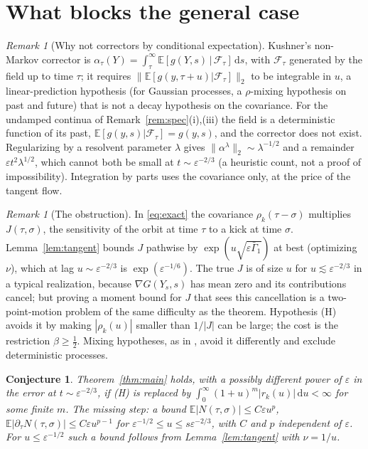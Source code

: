 \documentclass[11pt]{article}
\newcommand{\dd}{\mathrm{d}}
\newcommand{\E}{\mathbb{E}}
\newcommand{\eps}{\varepsilon}
\newcommand{\nrm}[2]{\|#1\|_{#2}}
\newtheorem{conjecture}[theorem]{Conjecture}
\theoremstyle{remark}
\newtheorem{remark}[theorem]{Remark}
\begin{document}
\section{What blocks the general case}
\label{sec:open}

\begin{remark}[Why not correctors by conditional expectation]\label{rem:kushner}
Kushner's non-Markov corrector is
$\alpha_\tau(Y) = \int_\tau^\infty\E[g(Y,s)\,|\,\mathcal{F}_\tau]\,\dd s$, with
$\mathcal{F}_\tau$ generated by the field up to time $\tau$; it requires
$\nrm{\E[g(y,\tau+u)|\mathcal{F}_\tau]}{2}$ to be integrable in $u$, a
linear-prediction hypothesis (for Gaussian processes, a $\rho$-mixing
hypothesis on past and future) that is not a decay hypothesis on the
covariance. For the undamped continua
of Remark~\ref{rem:spec}(i),(iii) the field is a deterministic function of
its past, $\E[g(y,s)|\mathcal{F}_\tau] = g(y,s)$, and the corrector does not
exist. Regularizing by a resolvent parameter $\lambda$ gives
$\nrm{\alpha^\lambda}{2}\sim\lambda^{-1/2}$ and a remainder
$\eps t^2\lambda^{1/2}$, which cannot both be small at $t\sim\eps^{-2/3}$
(a heuristic count, not a proof of impossibility). Integration by parts
uses the covariance only, at the price of the tangent flow.
\end{remark}

\begin{remark}[The obstruction]
In \eqref{eq:exact} the covariance $\rho_k(\tau-\sigma)$ multiplies
$J(\tau,\sigma)$, the sensitivity of the orbit at time $\tau$ to a kick at
time $\sigma$. Lemma~\ref{lem:tangent} bounds $J$ pathwise by
$\exp(u\sqrt{\eps\bar\Gamma_1})$ at best (optimizing $\nu$), which at lag
$u\sim\eps^{-2/3}$ is $\exp(\eps^{-1/6})$. The true $J$ is of size $u$ for
$u\lesssim\eps^{-2/3}$ in a typical realization, because
$\nabla G(Y_s,s)$ has mean zero and its contributions cancel; but proving a
moment bound for $J$ that sees this cancellation is a two-point-motion
problem of the same difficulty as the theorem. Hypothesis (H) avoids it by
making $|\rho_k(u)|$ smaller than $1/|J|$ can be large; the cost is the
restriction $\beta\ge\frac12$. Mixing hypotheses, as in \cite{KP}, avoid it
differently and exclude deterministic processes.
\end{remark}

\begin{conjecture}\label{conj:poly}
Theorem~\ref{thm:main} holds, with a possibly different power of $\eps$ in
the error at $t\sim\eps^{-2/3}$, if \textup{(H)} is replaced by
$\int_0^\infty(1+u)^m|r_k(u)|\,\dd u<\infty$ for some finite $m$. The
missing step: a bound $\E|N(\tau,\sigma)|\le C\eps u^{p}$,
$\E|\partial_\tau N(\tau,\sigma)|\le C\eps u^{p-1}$ for
$\eps^{-1/2}\le u\le s\eps^{-2/3}$, with $C$ and $p$ independent of $\eps$.
For $u\le\eps^{-1/2}$ such a bound follows from Lemma~\ref{lem:tangent}
with $\nu = 1/u$.
\end{conjecture}
\end{document}
